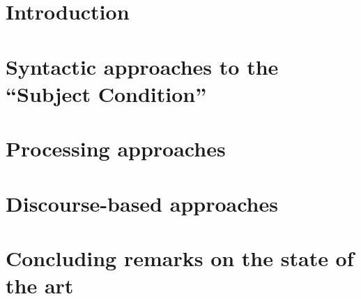 \chapter{Introduction}


\chapter{Syntactic approaches to the ``Subject Condition''}


\chapter{Processing approaches}
\label{ch:processing-accounts}



\chapter{Discourse-based approaches}


\chapter{Concluding remarks on the state of the art}
